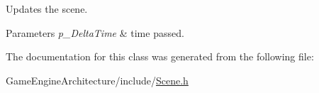 Updates the scene. 


\begin{DoxyParams}{Parameters}
{\em p\+\_\+\+Delta\+Time} & time passed. \\
\hline
\end{DoxyParams}


The documentation for this class was generated from the following file\+:\begin{DoxyCompactItemize}
\item 
Game\+Engine\+Architecture/include/\mbox{\hyperlink{_scene_8h}{Scene.\+h}}\end{DoxyCompactItemize}
